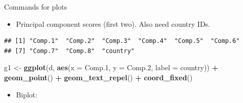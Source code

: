\documentclass[
  ignorenonframetext,
]{beamer}
\newenvironment{Shaded}{\begin{snugshade}}{\end{snugshade}}
\newcommand{\DataTypeTok}[1]{\textcolor[rgb]{0.13,0.29,0.53}{#1}}
\newcommand{\FloatTok}[1]{\textcolor[rgb]{0.00,0.00,0.81}{#1}}
\newcommand{\KeywordTok}[1]{\textcolor[rgb]{0.13,0.29,0.53}{\textbf{#1}}}
\newcommand{\NormalTok}[1]{#1}
\newcommand{\OperatorTok}[1]{\textcolor[rgb]{0.81,0.36,0.00}{\textbf{#1}}}
\newcommand{\StringTok}[1]{\textcolor[rgb]{0.31,0.60,0.02}{#1}}
\providecommand{\tightlist}{%
  \setlength{\itemsep}{0pt}\setlength{\parskip}{0pt}}
\begin{document}
\begin{frame}[fragile]{Commands for plots}
\protect\hypertarget{commands-for-plots}{}

\begin{itemize}
\tightlist
\item
  Principal component scores (first two). Also need country IDs.
\end{itemize}

\begin{Shaded}
\end{Shaded}

\begin{verbatim}
## [1] "Comp.1"  "Comp.2"  "Comp.3"  "Comp.4"  "Comp.5"  "Comp.6" 
## [7] "Comp.7"  "Comp.8"  "country"
\end{verbatim}

\begin{Shaded}
\begin{Highlighting}[]
\NormalTok{g1 <-}\StringTok{ }\KeywordTok{ggplot}\NormalTok{(d, }\KeywordTok{aes}\NormalTok{(}\DataTypeTok{x =}\NormalTok{ Comp}\FloatTok{.1}\NormalTok{, }\DataTypeTok{y =}\NormalTok{ Comp}\FloatTok{.2}\NormalTok{,}
  \DataTypeTok{label =}\NormalTok{ country)) }\OperatorTok{+}
\StringTok{  }\KeywordTok{geom_point}\NormalTok{() }\OperatorTok{+}\StringTok{ }\KeywordTok{geom_text_repel}\NormalTok{() }\OperatorTok{+}\StringTok{ }\KeywordTok{coord_fixed}\NormalTok{()}
\end{Highlighting}
\end{Shaded}

\begin{itemize}
\tightlist
\item
  Biplot:
\end{itemize}

\begin{Shaded}
\end{Shaded}

\end{frame}
\end{document}
